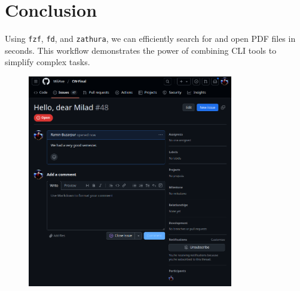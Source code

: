 \documentclass[12pt]{article}
\begin{document}
\section*{Conclusion}
Using \texttt{fzf}, \texttt{fd}, and \texttt{zathura}, we can efficiently search for and open PDF files in seconds. This workflow demonstrates the power of combining CLI tools to simplify complex tasks.

\begin{figure}[h]
    \centering
    \includegraphics[width=0.8\textwidth]{Screenshot from 2025-01-25 19-40-14.png}
\end{figure}
\end{document}
